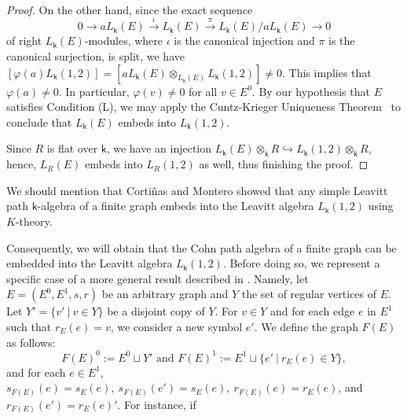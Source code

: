 \documentclass[a4paper, 11pt, reqno]{amsart}
\theoremstyle{definition}
\let\phi\varphi
\newcommand{\K}{\mathsf{k}}
\begin{document}
\begin{proof}
On the other hand, since the exact sequence $$0 \to  a L_\K(E)
\xrightarrow{\iota} L_\K(E) \xrightarrow{\pi} L_\K(E)/ a L_\K(E)\to 0$$ of right $L_\K(E)$-modules, where $\iota$ is the canonical injection and $\pi$ is the canonical surjection, is split, we have $[\phi(a)L_\K(1, 2)]=[aL_\K(E)\otimes_{L_\K(E)} L_\K(1, 2)]\neq 0.$ This implies that $\phi(a)\neq 0$. In particular, $\phi(v)\neq 0$ for all $v\in E^0$. 
By our hypothesis that $E$ satisfies Condition
(L), we may apply the Cuntz-Krieger Uniqueness Theorem~\cite[Theorem 2.2.16]{lpabook} to conclude that  $L_\K(E)$ embeds into $L_\K(1, 2)$.

Since $R$ is flat over $\K$, we have an injection $L_\K(E) \otimes_\K R \hookrightarrow L_\K(1,2) \otimes_\K R$, hence,   $L_R(E)$ embeds into $L_R(1, 2)$ as well, thus finishing the proof.
\end{proof}

We should mention that Corti\~ nas and Montero \cite[Corollary 3.2]{Cortinas2020} showed that any simple Leavitt path $\K$-algebra of a finite graph embeds into the Leavitt algebra $L_{\K}(1, 2)$ using $K$-theory.

Consequently, we will obtain that the Cohn path algebra of a finite graph can be embedded into the Leavitt algebra $L_{\K}(1, 2)$.  Before doing so, we represent a specific case of a more general result described in \cite[Section 1.5]{lpabook}. Namely,
let $E = (E^0, E^1, s, r)$ be an arbitrary graph and $Y$ the set of regular vertices of $E$.
Let $Y'=\{v'\ |\ v\in Y\}$ be a disjoint copy of $Y$. For $v\in Y$ and for each edge $e$ in $E^1$ such
that $r_E(e)=v$, we consider a new symbol $e'$. We define the graph $F(E)$ as follows:
$$F(E)^0 := E^0\sqcup Y' \text{ and } F(E)^1 :=E^1\sqcup \{e'\ |\ r_E(e)\in
Y\},$$ and for each $e\in E^1$, $s_{F(E)}(e)=s_E(e),\ s_{F(E)}(e')=s_E(e),\
r_{F(E)}(e)=r_E(e)$, and $r_{F(E)}(e')=r_E(e)'$. For instance, if
\end{document}
